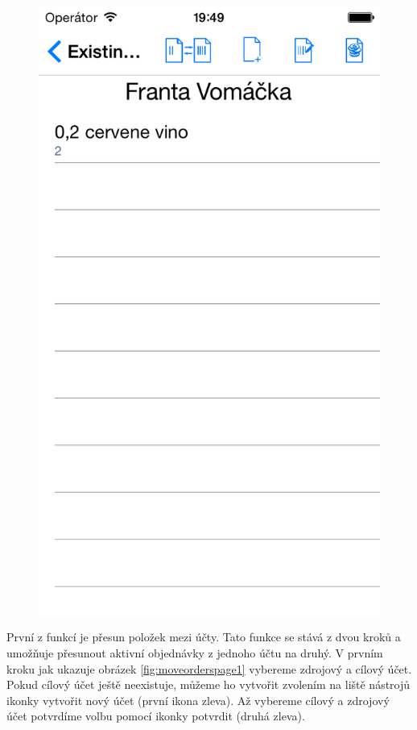 \begin{figure}[h]
\begin{minipage}{.5\textwidth}
  \includegraphics[width=.95\textwidth]{accounts2.png}
  \label{fig:accountspage2}
\end{minipage}
\end{figure}

První z funkcí je přesun položek mezi účty.
Tato funkce se stává z dvou kroků a umožňuje přesunout aktivní objednávky z jednoho účtu na druhý.
V prvním kroku jak ukazuje obrázek \ref{fig:moveorderspage1} vybereme zdrojový a cílový účet.
Pokud cílový účet ještě neexistuje, můžeme ho vytvořit zvolením na liště nástrojů ikonky vytvořit nový účet (první ikona zleva).
Až vybereme cílový a zdrojový účet potvrdíme volbu pomocí ikonky potvrdit (druhá zleva).

